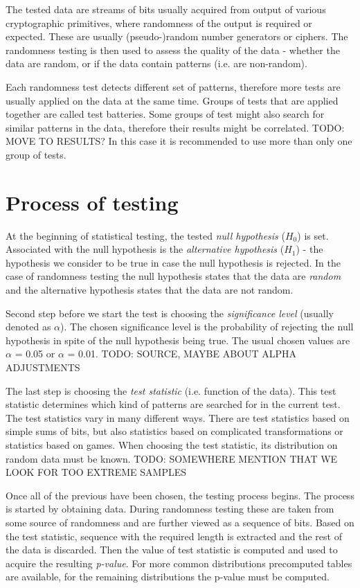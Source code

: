 \documentclass[
  digital,     %
  oneside,     %
  nosansbold,  %
  nocolorbold, %
  nolof,         %
  nolot,         %
]{fithesis4}
\begin{document}
The tested data are streams of bits usually acquired from output of various cryptographic primitives, where randomness of the output is required or expected. These are usually (pseudo-)random number generators or ciphers. The randomness testing is then used to assess the quality of the data - whether the data are random, or if the data contain patterns (i.e. are non-random).

Each randomness test detects different set of patterns, therefore more tests are usually applied on the data at the same time. Groups of tests that are applied together are called test batteries. Some groups of test might also search for similar patterns in the data, therefore their results might be correlated. \cite[p. 2]{bad_day} TODO: MOVE TO RESULTS? In this case it is recommended to use more than only one group of tests.

\section{Process of testing} \label{chap:rand-process}

At the beginning of statistical testing, the tested \emph{null hypothesis}  ($H_0$) is set. Associated with the null hypothesis is the \emph{alternative hypothesis} ($H_1$) - the hypothesis we consider to be true in case the null hypothesis is rejected. In the case of randomness testing the null hypothesis states that the data are \emph{random} and the alternative hypothesis states that the data are not random.

Second step before we start the test is choosing the \emph{significance level} (usually denoted as $\alpha$). The chosen significance level is the probability of rejecting the null hypothesis in spite of the null hypothesis being true. The usual chosen values are $\alpha$ = 0.05 or $\alpha$ = 0.01. TODO: SOURCE, MAYBE ABOUT ALPHA ADJUSTMENTS

The last step is choosing the \emph{test statistic} (i.e. function of the data). This test statistic determines which kind of patterns are searched for in the current test. The test statistics vary in many different ways. There are test statistics based on simple sums of bits, but also statistics based on complicated transformations or statistics based on games. When choosing the test statistic, its distribution on random data must be known. TODO: SOMEWHERE MENTION THAT WE LOOK FOR TOO EXTREME SAMPLES

Once all of the previous have been chosen, the testing process begins. The process is started by obtaining data. During randomness testing these are taken from some source of randomness and are further viewed as a sequence of bits. Based on the test statistic, sequence with the required length is extracted and the rest of the data is discarded. Then the value of test statistic is computed and used to acquire the resulting \emph{p-value}. For more common distributions precomputed tables are available, for the remaining distributions the p-value must be computed.
\end{document}
